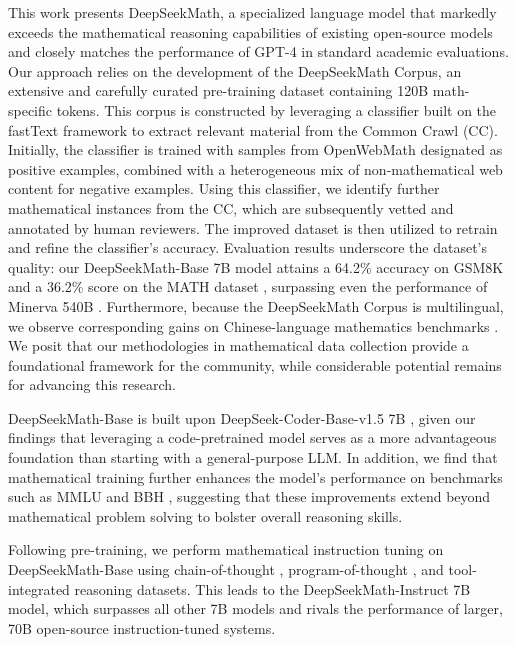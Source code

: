 This work presents DeepSeekMath, a specialized language model that markedly exceeds the mathematical reasoning capabilities of existing open-source models and closely matches the performance of GPT-4 in standard academic evaluations. Our approach relies on the development of the DeepSeekMath Corpus, an extensive and carefully curated pre-training dataset containing 120B math-specific tokens. This corpus is constructed by leveraging a classifier built on the fastText framework \citep{joulin2016fasttext} to extract relevant material from the Common Crawl (CC). Initially, the classifier is trained with samples from OpenWebMath \citep{openwebmath} designated as positive examples, combined with a heterogeneous mix of non-mathematical web content for negative examples. Using this classifier, we identify further mathematical instances from the CC, which are subsequently vetted and annotated by human reviewers. The improved dataset is then utilized to retrain and refine the classifier’s accuracy. Evaluation results underscore the dataset’s quality: our DeepSeekMath-Base 7B model attains a 64.2\% accuracy on GSM8K \citep{gsm8k} and a 36.2\% score on the MATH dataset \citep{MATH}, surpassing even the performance of Minerva 540B \citep{minerva}. Furthermore, because the DeepSeekMath Corpus is multilingual, we observe corresponding gains on Chinese-language mathematics benchmarks \citep{wei2023cmath,agieval}. We posit that our methodologies in mathematical data collection provide a foundational framework for the community, while considerable potential remains for advancing this research.

DeepSeekMath-Base is built upon DeepSeek-Coder-Base-v1.5 7B \citep{deepseek-coder}, given our findings that leveraging a code-pretrained model serves as a more advantageous foundation than starting with a general-purpose LLM. In addition, we find that mathematical training further enhances the model's performance on benchmarks such as MMLU \citep{mmlu} and BBH \citep{bbh}, suggesting that these improvements extend beyond mathematical problem solving to bolster overall reasoning skills.

Following pre-training, we perform mathematical instruction tuning on DeepSeekMath-Base using chain-of-thought \citep{cot}, program-of-thought \citep{pot,pal}, and tool-integrated reasoning \citep{tora} datasets. This leads to the DeepSeekMath-Instruct 7B model, which surpasses all other 7B models and rivals the performance of larger, 70B open-source instruction-tuned systems.

